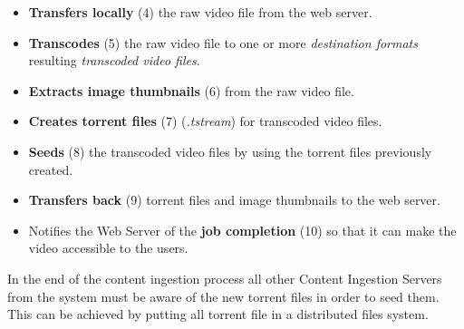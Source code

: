 \begin{itemize}
 \item \textbf{Transfers locally} (4) the raw video file from the web server.
 \item \textbf{Transcodes} (5) the raw video file to one or more \textit{destination formats} resulting \textit{transcoded video files}.
 \item \textbf{Extracts image thumbnails} (6) from the raw video file.
 \item \textbf{Creates torrent files} (7) (\textit{.tstream}) for transcoded video files.
 \item \textbf{Seeds} (8) the transcoded video files by using the torrent files previously created.
 \item \textbf{Transfers back} (9) torrent files and image thumbnails to the web server.
 \item Notifies the Web Server of the \textbf{job completion} (10) so that it can make the video accessible to the users.
\end{itemize}

In the end of the content ingestion process all other Content Ingestion Servers from the system must be aware of the new torrent files in order to seed them. This can be achieved by putting all torrent file in a distributed files system.